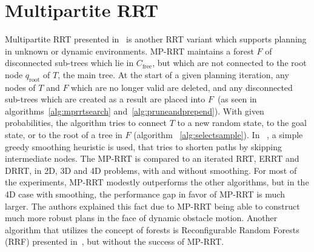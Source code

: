 \section{Multipartite RRT}
\label{sec:MPRRT}
Multipartite RRT presented in~\cite{Zucker07} is another RRT variant which
supports planning in unknown or dynamic environments. MP-RRT maintains a
forest $F$ of disconnected sub-trees which lie in \(C_{\text{free}}\), but which are not
connected to the root node \(q_{\text{root}}\) of $T$, the main tree. At the start of a
given planning iteration, any nodes of $T$ and $F$ which are no longer valid are
deleted, and any disconnected sub-trees which are created as a result are placed
into $F$~(as seen in algorithms~\ref{alg:mprrtsearch} and~\ref{alg:pruneandprepend}).
With given probabilities,
the algorithm tries to connect $T$ to a
new random state, to the goal state, or to the root of a tree in $F$ (algorithm~%
\ref{alg:selectsample}). In~%
\cite{Zucker07}, a simple greedy smoothing heuristic is used, that tries to
shorten paths by skipping intermediate nodes. The MP-RRT
is compared to an iterated RRT, ERRT and DRRT, in 2D, 3D and 4D problems, with
and without smoothing. For most of the experiments, MP-RRT modestly outperforms
the other algorithms, but in the 4D case with smoothing, the performance gap in
favor of MP-RRT is much larger. The authors explained this fact due to MP-RRT
being able to construct much more robust plans in the face of dynamic obstacle
motion. Another algorithm that utilizes the concept of forests is
Reconfigurable Random Forests (RRF) presented in~\cite{Li02}, but without the
success of MP-RRT.

